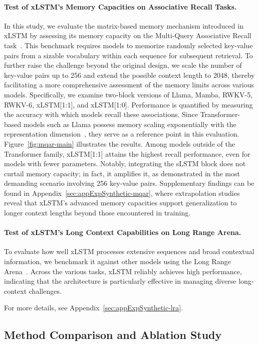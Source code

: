 \paragraph{Test of xLSTM's Memory Capacities on Associative Recall Tasks.} In this study, we evaluate the matrix-based memory mechanism introduced in xLSTM by assessing its memory capacity on the Multi-Query Associative Recall task~\citep{Arora:23arxiv}. This benchmark requires models to memorize randomly selected key-value pairs from a sizable vocabulary within each sequence for subsequent retrieval. To further raise the challenge beyond the original design, we scale the number of key-value pairs up to 256 and extend the possible context length to 2048, thereby facilitating a more comprehensive assessment of the memory limits across various models. Specifically, we examine two-block versions of Llama, Mamba, RWKV-5, RWKV-6, xLSTM[1:1], and xLSTM[1:0]. Performance is quantified by measuring the accuracy with which models recall these associations. Since Transformer-based models such as Llama possess memory scaling exponentially with the representation dimension~\citep{Ramsauer:21}, they serve as a reference point in this evaluation. Figure~\ref{fig:mqar-main} illustrates the results.
Among models outside of the Transformer family, xLSTM[1:1] attains the highest recall performance, even for models with fewer parameters. Notably, integrating the sLSTM block does not curtail memory capacity; in fact, it amplifies it, as demonstrated in the most demanding scenario involving 256 key-value pairs. Supplementary findings can be found in Appendix~\ref{sec:appExpSynthetic-mqar}, where extrapolation studies reveal that xLSTM's advanced memory capacities support generalization to longer context lengths beyond those encountered in training.

\paragraph{Test of xLSTM's Long Context Capabilities on Long Range Arena.} To evaluate how well xLSTM processes extensive sequences and broad contextual information, we benchmark it against other models using the Long Range Arena~\citep{Tay:21}. Across the various tasks, xLSTM reliably achieves high performance, indicating that the architecture is particularly effective in managing diverse long-context challenges.

For more details, see Appendix~\ref{sec:appExpSynthetic-lra}.

\subsection{Method Comparison and Ablation Study}
\label{sec:ExpComparison}

